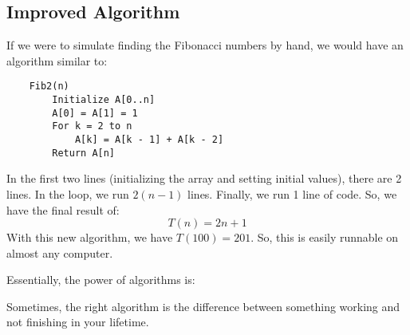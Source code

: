 \documentclass[letterpaper]{article}
\begin{document}
\subsection{Improved Algorithm}
If we were to simulate finding the Fibonacci numbers by hand, we would have an algorithm similar to:
\begin{verbatim}
    Fib2(n)
        Initialize A[0..n]
        A[0] = A[1] = 1
        For k = 2 to n
            A[k] = A[k - 1] + A[k - 2]
        Return A[n]
\end{verbatim}
In the first two lines (initializing the array and setting initial values), there are 2 lines. In the  loop, we run $2(n - 1)$ lines. Finally, we run 1 line of code. So, we have the final result of: 
\[T(n) = 2n + 1\]
With this new algorithm, we have $T(100) = 201$. So, this is easily runnable on almost any computer.

\bigskip 

Essentially, the power of algorithms is: 
\begin{mdframed}
    Sometimes, the right algorithm is the difference between something working and not finishing in your lifetime. 
\end{mdframed}
\end{document}
